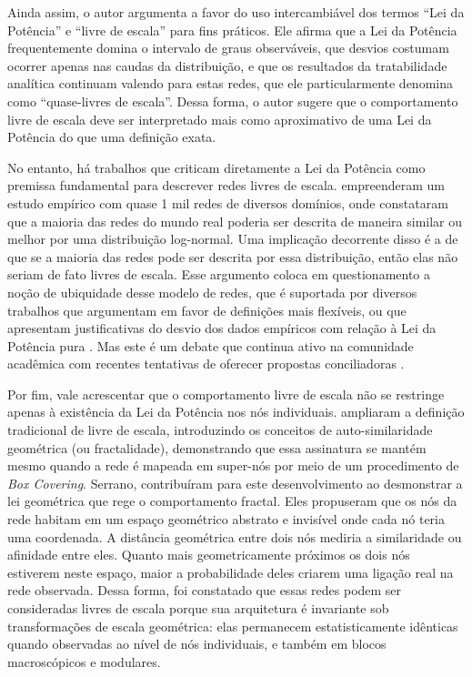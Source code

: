 \documentclass[12pt,oneside,a4paper,brazil,sumario=tradicional]{abntex2}
\begin{document}
Ainda assim, o autor argumenta a favor do uso intercambiável dos termos “Lei da Potência” e “livre de escala” para fins práticos. Ele afirma que a Lei da Potência frequentemente domina o intervalo de graus observáveis, que desvios costumam ocorrer apenas nas caudas da distribuição, e que os resultados da tratabilidade analítica continuam valendo para estas redes, que ele particularmente denomina como “quase-livres de escala”. Dessa forma, o autor sugere que o comportamento livre de escala deve ser interpretado mais como aproximativo de uma Lei da Potência do que uma definição exata.

No entanto, há trabalhos que criticam diretamente a Lei da Potência como premissa fundamental para descrever redes livres de escala. \textcite{broido2019} empreenderam um estudo empírico com quase 1 mil redes de diversos domínios, onde constataram que a maioria das redes do mundo real poderia ser descrita de maneira similar ou melhor por uma distribuição log-normal. Uma implicação decorrente disso é a de que se a maioria das redes pode ser descrita por essa distribuição, então elas não seriam de fato livres de escala. Esse argumento coloca em questionamento a noção de ubiquidade desse modelo de redes, que é suportada por diversos trabalhos que argumentam em favor de definições mais flexíveis, ou que apresentam justificativas do desvio dos dados empíricos com relação à Lei da Potência pura \parencite{artico2020, serafino2021, voitalov2019, zhang2021}. Mas este é um debate que continua ativo na comunidade acadêmica com recentes tentativas de oferecer propostas conciliadoras  \parencite{holme2019}.

Por fim, vale acrescentar que o comportamento livre de escala não se restringe apenas à existência da Lei da Potência nos nós individuais. \textcite{song2005} ampliaram a definição tradicional de livre de escala, introduzindo os conceitos de auto-similaridade geométrica (ou fractalidade), demonstrando que essa assinatura se mantém mesmo quando a rede é mapeada em super-nós por meio de um procedimento de \textit{Box Covering}. Serrano, \textcite{serrano2008} contribuíram para este desenvolvimento ao desmonstrar a lei geométrica que rege o comportamento fractal. Eles propuseram que os nós da rede habitam em um espaço geométrico abstrato e invisível onde cada nó teria uma coordenada. A distância geométrica entre  dois nós mediria a similaridade ou afinidade entre eles. Quanto mais geometricamente próximos os dois nós estiverem neste espaço, maior a probabilidade deles criarem uma ligação real na rede observada. Dessa forma, foi constatado que essas redes podem ser consideradas livres de escala porque sua arquitetura é invariante sob transformações de escala geométrica: elas permanecem estatisticamente idênticas quando observadas ao nível de nós individuais, e também em blocos macroscópicos e modulares.
\end{document}
